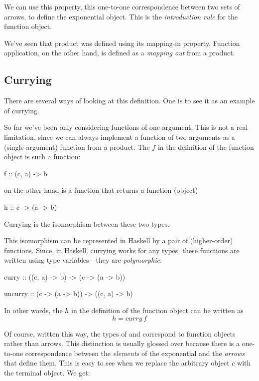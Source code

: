 \documentclass[DaoFP]{subfiles}
\begin{document}
We can use this property, this one-to-one correspondence between two sets of arrows, to define the exponential object. This is the \emph{introduction rule} for the function object. 

We've seen that product was defined using its mapping-in property. Function application, on the other hand, is defined as a \emph{mapping out} from a product. 

\subsection{Currying}

There are several ways of looking at this definition. One is to see it as an example of currying. 

So far we've been only considering functions of one argument. This is not a real limitation, since we can always implement a function of two arguments as a (single-argument) function from a product. The $f$ in the definition of the function object is such a function:
\begin{haskell}
f :: (c, a) -> b
\end{haskell}
 on the other hand is a function that returns a function (object)
\begin{haskell}
h :: c -> (a -> b)
\end{haskell}
Currying is the isomorphism between these two types. 

This isomorphism can be represented in Haskell by a pair of (higher-order) functions. Since, in Haskell, currying works for any types, these functions are written using type variables---they are \emph{polymorphic}:
\begin{haskell}
curry   :: ((c, a) -> b)   -> (c -> (a -> b))
\end{haskell}

\begin{haskell}
uncurry :: (c -> (a -> b)) -> ((c, a) -> b)
\end{haskell}
In other words, the $h$ in the definition of the function object can be written as 
\[ h = curry\, f \]

Of course, written this way, the types of  and  correspond to function objects rather than arrows. This distinction is usually glossed over because there is a one-to-one correspondence between the \emph{elements} of the exponential and the \emph{arrows} that define them. This is easy to see when we replace the arbitrary object $c$ with the terminal object. We get:
\end{document}
